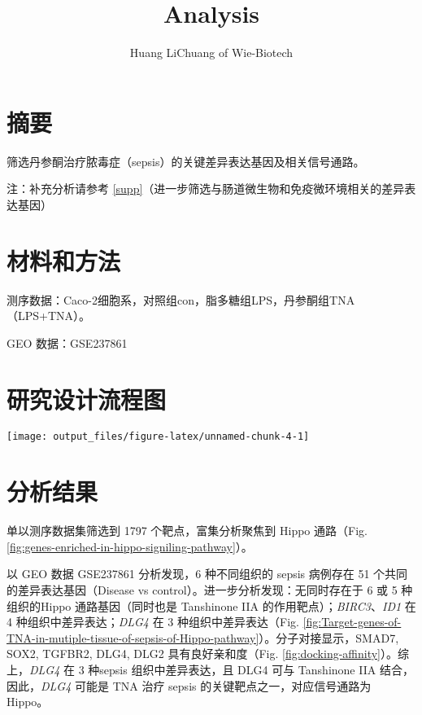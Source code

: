 \documentclass[
]{article}
\title{Analysis}
\author{Huang LiChuang of Wie-Biotech}
\date{}
\begin{document}
\maketitle

{
\setcounter{tocdepth}{3}
\tableofcontents
}
\listoffigures

\listoftables

\hypertarget{abstract}{%
\section{摘要}\label{abstract}}

筛选丹参酮治疗脓毒症（sepsis）的关键差异表达基因及相关信号通路。

注：补充分析请参考 \ref{supp}（进一步筛选与肠道微生物和免疫微环境相关的差异表达基因）

\hypertarget{methods}{%
\section{材料和方法}\label{methods}}

测序数据：Caco-2细胞系，对照组con，脂多糖组LPS，丹参酮组TNA（LPS+TNA）。

GEO 数据：GSE237861

\hypertarget{route}{%
\section{研究设计流程图}\label{route}}

\texttt{[image: output\_files/figure-latex/unnamed-chunk-4-1]}

\hypertarget{results}{%
\section{分析结果}\label{results}}

单以测序数据集筛选到 1797 个靶点，富集分析聚焦到 Hippo 通路（Fig. \ref{fig:genes-enriched-in-hippo-signiling-pathway}）。

以 GEO 数据 GSE237861 分析发现，6 种不同组织的 sepsis 病例存在 51 个共同的差异表达基因（Disease vs control）。进一步分析发现：无同时存在于 6 或 5 种组织的Hippo 通路基因（同时也是 Tanshinone IIA 的作用靶点）；\emph{BIRC3}、\emph{ID1} 在 4 种组织中差异表达；\emph{DLG4} 在 3 种组织中差异表达（Fig. \ref{fig:Target-genes-of-TNA-in-mutiple-tissue-of-sepsis-of-Hippo-pathway}）。分子对接显示，SMAD7, SOX2, TGFBR2, DLG4, DLG2 具有良好亲和度（Fig. \ref{fig:docking-affinity}）。综上，\emph{DLG4} 在 3 种sepsis 组织中差异表达，且 DLG4 可与 Tanshinone IIA 结合，因此，\emph{DLG4} 可能是 TNA 治疗 sepsis 的关键靶点之一，对应信号通路为 Hippo。
\end{document}
